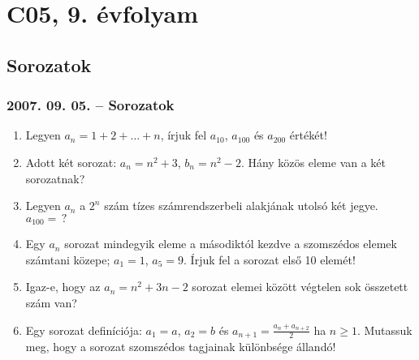 \chapter{C05, 9. évfolyam}
\section{Sorozatok}

\subsection*{2007. 09. 05. -- Sorozatok}
\begin{enumerate}
\item Legyen  $a_n=1+2+\ldots+n$, írjuk fel $a_{10}$, $a_{100}$ és $a_{200}$ értékét!
\item Adott két sorozat: $a_n=n^2+3$, $b_n=n^2-2$.  Hány közös eleme van a két sorozatnak?
\item Legyen $a_n$ a $2^n$ szám tízes számrendszerbeli alakjának utolsó két jegye. $a_{100}=\,?$
\item Egy $a_n$ sorozat mindegyik eleme a másodiktól kezdve a szomszédos elemek számtani közepe;
$a_1=1$, $a_5=9$. Írjuk fel a sorozat első 10 elemét!
\item Igaz-e, hogy az $a_n=n^2+3n-2$ sorozat elemei között végtelen sok összetett szám van?
\item Egy sorozat definíciója: $a_1=a$, $a_2=b$ és $\displaystyle{a_{n+1}=\frac{a_n+a_{n+2}}{2}}$ ha $n\ge 1$.
Mutassuk meg, hogy a sorozat szomszédos tagjainak különbsége állandó!
\end{enumerate}


